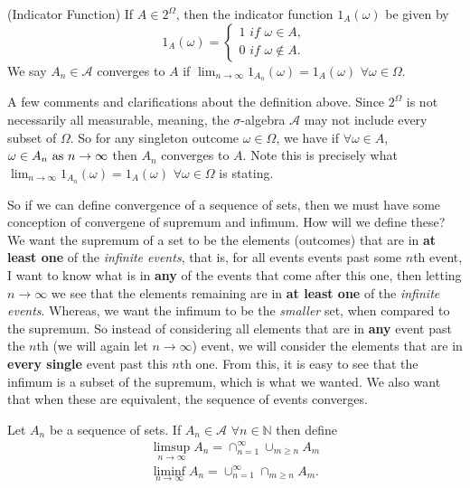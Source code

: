 \documentclass[../main.tex]{subfiles}
\begin{document}
\begin{definition}(Indicator Function)\label{def:indicator function}
If $A \in 2^\Omega$, then the indicator function $1_A(\omega)$ be given by
\[
1_A(\omega) = 
\begin{cases}
    1 \textit{ if } \omega \in A,\\
    0 \textit{ if } \omega \notin A.
\end{cases}
\]
We say $A_n \in \mathcal{A}$ converges to $A$ if $\lim_{n\to\infty}{1_{A_n}(\omega)} = 1_A(\omega)$ $\forall \omega \in \Omega$.
\end{definition}
\begin{remark}
A few comments and clarifications about the definition above. Since $2^\Omega$
is not necessarily all measurable, meaning, the $\sigma$-algebra $\mathcal{A}$
may not include every subset of $\Omega$. So for any singleton outcome $\omega \in \Omega$, 
we have if $\forall \omega \in A$, $\omega \in A_n \textnormal{ as } n \to \infty$ then $A_n$ converges to $A$.
Note this is precisely what $\lim_{n\to\infty}{1_{A_n}(\omega)} = 1_A(\omega)$ $\forall \omega \in \Omega$ is stating.
\end{remark}

\begin{remark}
So if we can define convergence of a sequence of sets, then we must have some conception of 
convergene of supremum and infimum. How will we define these? We want the supremum of a set to be 
the elements (outcomes) that are in \textbf{at least one} of the \textit{infinite events}, that is, for all events events past some $n$th event,
I want to know what is in \textbf{any} of the events that come after this one, then letting $n\to \infty$ we see that
the elements remaining are in \textbf{at least one} of the \textit{infinite events}. Whereas, we want the infimum to be the \textit{smaller} 
set, when compared to the supremum. So instead of considering all elements that are in \textbf{any} event past the $n$th (we will again let $n\to\infty$) event, 
we will consider the elements that are in \textbf{every single} event past this $n$th one. From this, it is easy to see that the infimum
is a subset of the supremum, which is what we wanted. We also want that when these are equivalent, the sequence of events converges.
\end{remark}

\begin{definition}\label{def:sup and inf of sequence of sets}
Let $A_n$ be a sequence of sets. If $A_n \in \mathcal{A}$ $\forall n \in \mathbb{N}$ then define
\begin{gather*}
\limsup_{n\to\infty}{A_n} = \cap^\infty_{n=1}\cup_{m \geq n}{A_m}\\
\liminf_{n\to\infty}{A_n} = \cup^\infty_{n=1}\cap_{m\geq n}{A_m}.
\end{gather*}

\end{definition}
\end{document}

